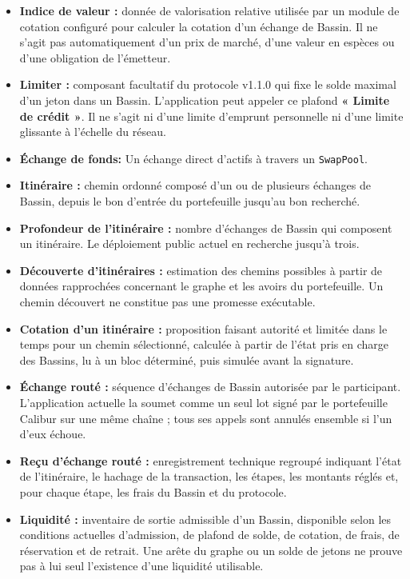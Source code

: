 \documentclass[11pt]{article}
\begin{document}
\begin{itemize}[leftmargin=*]
\item \textbf{Indice de valeur :} donnée de valorisation relative utilisée par un module de cotation configuré pour calculer la cotation d'un échange de Bassin. Il ne s'agit pas automatiquement d'un prix de marché, d'une valeur en espèces ou d'une obligation de l'émetteur.
\item \textbf{Limiter :} composant facultatif du protocole v1.1.0 qui fixe le solde maximal d'un jeton dans un Bassin. L'application peut appeler ce plafond \textbf{« Limite de crédit »}. Il ne s'agit ni d'une limite d'emprunt personnelle ni d'une limite glissante à l'échelle du réseau.
\item \textbf{Échange de fonds:} Un échange direct d'actifs à travers un \texttt{SwapPool}.
\item \textbf{Itinéraire :} chemin ordonné composé d'un ou de plusieurs échanges de Bassin, depuis le bon d'entrée du portefeuille jusqu'au bon recherché.
\item \textbf{Profondeur de l'itinéraire :} nombre d'échanges de Bassin qui composent un itinéraire. Le déploiement public actuel en recherche jusqu'à trois.
\item \textbf{Découverte d'itinéraires :} estimation des chemins possibles à partir de données rapprochées concernant le graphe et les avoirs du portefeuille. Un chemin découvert ne constitue pas une promesse exécutable.
\item \textbf{Cotation d'un itinéraire :} proposition faisant autorité et limitée dans le temps pour un chemin sélectionné, calculée à partir de l'état pris en charge des Bassins, lu à un bloc déterminé, puis simulée avant la signature.
\item \textbf{Échange routé :} séquence d'échanges de Bassin autorisée par le participant. L'application actuelle la soumet comme un seul lot signé par le portefeuille Calibur sur une même chaîne ; tous ses appels sont annulés ensemble si l'un d'eux échoue.
\item \textbf{Reçu d'échange routé :} enregistrement technique regroupé indiquant l'état de l'itinéraire, le hachage de la transaction, les étapes, les montants réglés et, pour chaque étape, les frais du Bassin et du protocole.
\item \textbf{Liquidité :} inventaire de sortie admissible d'un Bassin, disponible selon les conditions actuelles d'admission, de plafond de solde, de cotation, de frais, de réservation et de retrait. Une arête du graphe ou un solde de jetons ne prouve pas à lui seul l'existence d'une liquidité utilisable.

\end{itemize}
\end{document}
